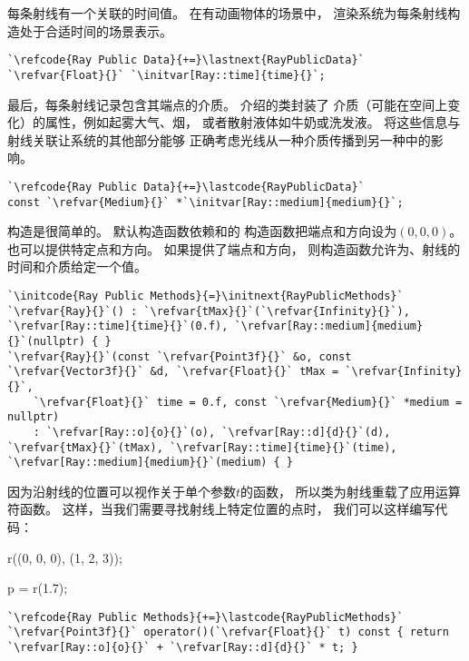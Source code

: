每条射线有一个关联的时间值。
在有动画物体的场景中，
渲染系统为每条射线构造处于合适时间的场景表示。
\begin{lstlisting}
`\refcode{Ray Public Data}{+=}\lastnext{RayPublicData}`
`\refvar{Float}{}` `\initvar[Ray::time]{time}{}`;
\end{lstlisting}

最后，每条射线记录包含其端点的介质。
介绍的类封装了
介质（可能在空间上变化）的属性，例如起雾大气、烟，
或者散射液体如牛奶或洗发液。
将这些信息与射线关联让系统的其他部分能够
正确考虑光线从一种介质传播到另一种中的影响。
\begin{lstlisting}
`\refcode{Ray Public Data}{+=}\lastcode{RayPublicData}`
const `\refvar{Medium}{}` *`\initvar[Ray::medium]{medium}{}`;
\end{lstlisting}

构造是很简单的。
默认构造函数依赖和的
构造函数把端点和方向设为$(0,0,0)$。
也可以提供特定点和方向。
如果提供了端点和方向，
则构造函数允许为、射线的时间和介质给定一个值。
\begin{lstlisting}
`\initcode{Ray Public Methods}{=}\initnext{RayPublicMethods}`
`\refvar{Ray}{}`() : `\refvar{tMax}{}`(`\refvar{Infinity}{}`), `\refvar[Ray::time]{time}{}`(0.f), `\refvar[Ray::medium]{medium}{}`(nullptr) { }
`\refvar{Ray}{}`(const `\refvar{Point3f}{}` &o, const `\refvar{Vector3f}{}` &d, `\refvar{Float}{}` tMax = `\refvar{Infinity}{}`,
    `\refvar{Float}{}` time = 0.f, const `\refvar{Medium}{}` *medium = nullptr)
    : `\refvar[Ray::o]{o}{}`(o), `\refvar[Ray::d]{d}{}`(d), `\refvar{tMax}{}`(tMax), `\refvar[Ray::time]{time}{}`(time), `\refvar[Ray::medium]{medium}{}`(medium) { }
\end{lstlisting}

因为沿射线的位置可以视作关于单个参数$t$的函数，
所以类为射线重载了应用运算符函数。
这样，当我们需要寻找射线上特定位置的点时，
我们可以这样编写代码：

{\ttfamily\indent\indent{} r((0, 0, 0), (1, 2, 3));}

{\ttfamily\indent\indent{} p = r(1.7);}

\begin{lstlisting}
`\refcode{Ray Public Methods}{+=}\lastcode{RayPublicMethods}`
`\refvar{Point3f}{}` operator()(`\refvar{Float}{}` t) const { return `\refvar[Ray::o]{o}{}` + `\refvar[Ray::d]{d}{}` * t; }
\end{lstlisting}

